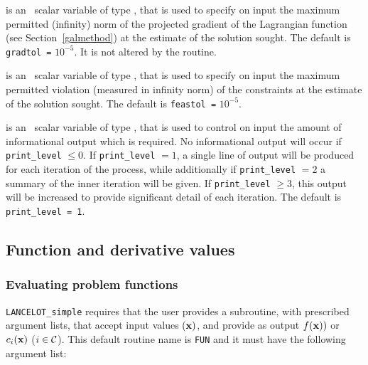 \documentclass{galahad}
\newcommand{\calC}{{\cal C}}
\begin{document}
\begin{description}
 is an \optional\ scalar variable of type \realdp,
that is used to specify on input the maximum permitted (infinity)
norm of the projected gradient of the Lagrangian function
(see Section~\ref{galmethod}) at the estimate of the solution sought.
The default is {\tt gradtol =} $10^{-5}$.  It is not altered by the routine.

 is an \optional\ scalar variable of type \realdp,
that is used to specify on input the maximum permitted violation (measured in
infinity norm) of the constraints at the estimate of the solution sought.
The default is {\tt feastol =} $10^{-5}$.

 is an \optional\ scalar variable of type \integer,
that is used to control on input the amount of informational output which is
required. No informational output will occur if {\tt print\_level} $\leq 0$. If
{\tt print\_level} $= 1$, a single line of output will be produced for each
iteration of the process, while additionally if {\tt print\_level} $= 2$
a summary of the inner iteration will be given.
If {\tt print\_level} $\geq 3$, this output will be
increased to provide significant detail of each iteration.
The default is {\tt print\_level = 1}.
\end{description}

\subsection{Function and derivative values\label{fdv}}


\subsubsection{Evaluating problem functions\label{pfe}}

{\tt LANCELOT\_simple} requires that the user provides a
subroutine, with prescribed argument lists, that accept input
values $({\mathbf{x}})$, and provide as output
$f({\mathbf{x}}))$ or $c_i({\mathbf{x}})$ ($i \in \calC$).
This default routine name is {\tt FUN} and it must have the following argument
list:
\end{document}
